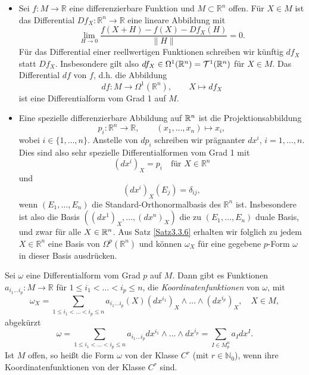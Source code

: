 \documentclass[a4paper,twoside,DIV15,BCOR12mm]{scrbook}
\begin{document}
 \begin{itemize}
\item Sei $f: M \to {\mathbb R}$ eine differenzierbare Funktion 
und $M \subset {\mathbb R}^{n}$ offen. Für $X \in M$ ist das Differential 
$Df_{X}: {\mathbb R}^{n} \to {\mathbb R}$ eine lineare Abbildung mit
\[ \lim_{H \to 0} \frac{f(X + H) - f(X) - Df_{X}(H)}{\|H\|} = 0. \]
Für das Differential einer reellwertigen Funktionen schreiben wir künftig 
$df_{X}$ statt $Df_{X}$. Insbesondere gilt also 
$df_{X} \in\Omega^{1}({\mathbb R}^{n}) = {\cal T}^{1}({\mathbb R}^{n})$ für $X \in M$. 
Das Differential $df$ von $f$, d.h. die Abbildung 
\[ df: M \to \Omega^{1}({\mathbb R}^{n}), \qquad X \mapsto df_{X} \]
ist eine Differentialform vom Grad 1 auf $M$.
\item Eine spezielle differenzierbare Abbildung auf $\mathbb{R}^n$ ist die Projektionsabbildung
\[ p_{i}: {\mathbb R}^{n} \to {\mathbb R}, \qquad (x_{1},\dots,x_{n}) \mapsto x_{i}, \]
wobei $i\in\{1,\ldots,n\}$. 
Anstelle von $dp_{i}$ schreiben wir prägnanter $dx^{i}$, $i = 1,\dots,n$. Dies sind also sehr spezielle Differentialformen vom Grad 1 mit 
\[(dx^{i})_{X} = p_{i}\quad \text{für } X \in {\mathbb R}^{n}\]
und
\[ (dx^{i})_{X}(E_{j}) = \delta_{ij}, \]
wenn $(E_{1},\dots,E_{n})$ die Standard-Orthonormalbasis des ${\mathbb R}^{n}$ ist.
Insbesondere ist also die Basis $((dx^{1})_{X},\dots,(dx^{n})_{X})$ die zu $(E_{1},\dots,E_{n})$ duale Basis,  
und zwar für alle $X\in\mathbb{R}^n$. 
Aus Satz \ref{Satz3.3.6} erhalten wir folglich zu jedem $X \in {\mathbb R}^{n}$ 
eine Basis von $\Omega^{p}({\mathbb R}^{n})$ und können $\omega_{X}$ für 
eine gegebene $p$-Form $\omega$ in dieser Basis ausdrücken.
\end{itemize}

\bigskip

 Sei $\omega$ eine Differentialform vom Grad $p$ auf $M$. 
Dann gibt es Funktionen $a_{i_{1} \dots i_{p}}: M \to {\mathbb R}$ 
für $1 \le i_{1} < \dots < i_{p} \le n$, die {\em Koordinatenfunktionen} von 
$\omega$, mit
\[ \omega_{X} = \sum_{1 \le i_{1} < \dots < i_{p} \le n}
 a_{i_{1}\dots i_{p}}(X)(dx^{i_1})_{X} \wedge \dots \wedge (dx^{i_p})_{X}, \quad X \in M, \]
abgekürzt 
\begin{equation}\label{3.4.1}
\omega = \sum_{1 \le i_{1} < \dots < i_{p} \le n} a_{i_{1} \dots i_{p}} dx^{i_1} 
\wedge \dots \wedge dx^{i_p} = \sum_{I \in M_{p}^{n}} a_{I} dx^{I}.
\end{equation}
Ist $M$ offen, so heißt die Form $\omega$ von der Klasse $C^{r}$ (mit $r \in {\mathbb N}_{0}$), 
wenn ihre Koordinatenfunktionen von der Klasse $C^{r}$ sind.\\ 
\end{document}
